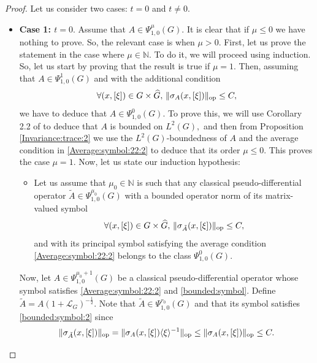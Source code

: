 \documentclass[12pt, reqno]{amsart}
\theoremstyle{definition}
\theoremstyle{remark}
\numberwithin{equation}{section}
\begin{document}
\begin{proof}
   Let us consider two cases: $t=0$ and $t\neq 0.$ 
    \begin{itemize}
        \item {\bf Case 1: $t=0.$} Assume that $ A\in \Psi^{\mu}_{1,0}(G).$ It is clear that if $\mu\leq 0$ we have nothing to prove. So, the relevant case is when $\mu>0.$ First, let us prove the statement in the case where $\mu \in \mathbb{N}.$ To do it, we will proceed using induction. So, let us start by proving that the result is true if $\mu=1.$ Then, assuming that $A\in \Psi^{1}_{1,0}(G)$ and with the additional condition  
   \begin{equation}\label{bounded:symbol}
      \forall(x,[\xi])\in G\times \widehat{G},\,  \Vert \sigma_A(x,[\xi])\Vert_{\textnormal{op}}\leq C,
    \end{equation} we have to deduce that $A\in \Psi^0_{1,0}(G).$ To prove this, we will use Corollary 2.2 of \cite{RuzhanskyTurunen2011} to deduce that $A$ is bounded on $L^2(G),$ and then from   Proposition \ref{Invariance:trace:2} we use the $L^2(G)$-boundedness of $A$ and the average condition in \eqref{Average:symbol:22:2} to deduce that its order $\mu\leq 0.$ This proves the case $\mu=1.$ Now, let us state our induction hypothesis:
    \begin{itemize}
        \item Let us assume that $\mu_0\in \mathbb{N}$ is such that
    any classical pseudo-differential operator $\tilde A\in \Psi^{\mu_0}_{1,0}(G)$ with a bounded operator norm of its matrix-valued symbol
    \begin{equation}\label{bounded:symbol:2}
      \forall(x,[\xi])\in G\times \widehat{G},\,  \Vert \sigma_{\tilde A}(x,[\xi])\Vert_{\textnormal{op}}\leq C,
    \end{equation} and with its principal symbol satisfying the average condition \eqref{Average:symbol:22:2} belongs to the class $\Psi^{0}_{1,0}(G).$
    \end{itemize}
    Now, let $A\in \Psi^{\mu_0+1}_{1,0}(G)$ be a classical pseudo-differential operator whose symbol satisfies \eqref{Average:symbol:22:2} and \eqref{bounded:symbol}.  Define $\tilde{A}=A(1+\mathcal{L}_G)^{-\frac{1}{2}}.$ Note that $\tilde A\in \Psi^{r_0}_{1,0}(G)$ and that its symbol satisfies \eqref{bounded:symbol:2} since
    \begin{align*}
        \Vert \sigma_{ \tilde{A}}(x,[\xi])\Vert_{\textnormal{op}}=\Vert \sigma_{{A}}(x,[\xi])\langle\xi\rangle^{-1}\Vert_{\textnormal{op}}\leq  \Vert \sigma_{A}(x,[\xi])\Vert_{\textnormal{op}}\leq C.

\end{align*}
\end{itemize}
\end{proof}
\end{document}
